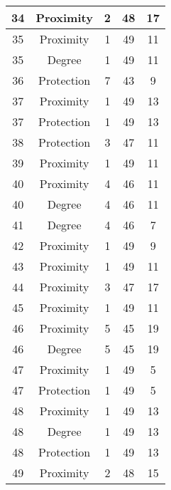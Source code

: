 \documentclass[results.tex]{subfiles}
\begin{document}
\begin{center}
\begin{tabular}{| c || c | c | c | c |}
    34 & Proximity & 2 & 48 & 17 \\ 
    \hline
    35 & Proximity & 1 & 49 & 11 \\ 
    \hline
    35 & Degree & 1 & 49 & 11 \\ 
    \hline
    36 & Protection & 7 & 43 & 9 \\ 
    \hline
    37 & Proximity & 1 & 49 & 13 \\ 
    \hline
    37 & Protection & 1 & 49 & 13 \\ 
    \hline
    38 & Protection & 3 & 47 & 11 \\ 
    \hline
    39 & Proximity & 1 & 49 & 11 \\ 
    \hline
    40 & Proximity & 4 & 46 & 11 \\ 
    \hline
    40 & Degree & 4 & 46 & 11 \\ 
    \hline
    41 & Degree & 4 & 46 & 7 \\ 
    \hline
    42 & Proximity & 1 & 49 & 9 \\ 
    \hline
    43 & Proximity & 1 & 49 & 11 \\ 
    \hline
    44 & Proximity & 3 & 47 & 17 \\ 
    \hline
    45 & Proximity & 1 & 49 & 11 \\ 
    \hline
    46 & Proximity & 5 & 45 & 19 \\ 
    \hline
    46 & Degree & 5 & 45 & 19 \\ 
    \hline
    47 & Proximity & 1 & 49 & 5 \\ 
    \hline
    47 & Protection & 1 & 49 & 5 \\ 
    \hline
    48 & Proximity & 1 & 49 & 13 \\ 
    \hline
    48 & Degree & 1 & 49 & 13 \\ 
    \hline
    48 & Protection & 1 & 49 & 13 \\ 
    \hline
    49 & Proximity & 2 & 48 & 15 \\ 
    \hline   \end{tabular}
\end{center}
\end{document}

